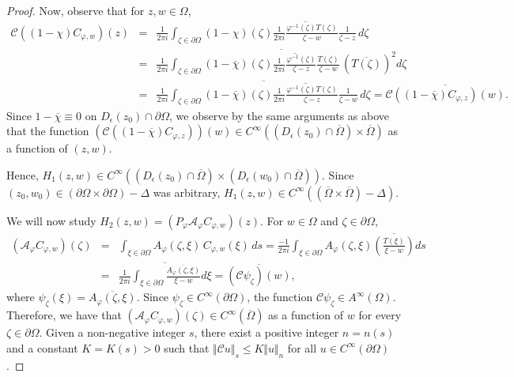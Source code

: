 \documentclass[11pt, reqno]{amsart}
\numberwithin{equation}{section}
\begin{document}
\begin{proof}
Now, observe that for $z,w\in\Omega$, 
\begin{eqnarray*}
\mathcal{C}((1-\chi)C_{\varphi,w})(z)
&=&
\frac{1}{2\pi i}\int_{\zeta\in\partial\Omega}(1-\chi)(\zeta) \overline{\frac{1}{2\pi i}\frac{\varphi^{-1}(\zeta)T(\zeta)}{\zeta-w}}\frac{1}{\zeta-z}\,d\zeta
\\
&=&
\overline{\frac{1}{2\pi i}\int_{\zeta\in\partial\Omega}(1-\overline{\chi})(\zeta) \overline{\frac{1}{2\pi i}\frac{\varphi^{-1}(\zeta)}{\zeta-z}}\frac{T(\zeta)}{\zeta-w}\,(\overline{T(\zeta)})^2 d\zeta}\\
&=&
\overline{\frac{1}{2\pi i}\int_{\zeta\in\partial\Omega}(1-\overline{\chi})(\zeta) \overline{\frac{1}{2\pi i}\frac{\varphi^{-1}(\zeta)T(\zeta)}{\zeta-z}}\frac{1}{\zeta-w}\,d\zeta}
=
\overline{\mathcal{C}((1-\overline{\chi})C_{\varphi,z})(w)}.
\end{eqnarray*}
Since $1-\overline{\chi}\equiv 0$ on $D_{\epsilon}(z_0)\cap\partial\Omega$, we observe by the same arguments as above that the function $(\mathcal{C}((1-\overline{\chi})C_{\varphi,z}))(w)\in C^{\infty}((D_{\epsilon}(z_0)\cap\overline{\Omega})\times \overline{\Omega})$ as a function of $(z,w)$. 

\medskip

Hence, $H_1(z,w)\in C^{\infty}((D_{\epsilon}(z_0)\cap\overline{\Omega})\times (D_{\epsilon}(w_0)\cap\overline{\Omega}))$. Since $(z_0,w_0)\in (\partial\Omega\times\partial\Omega)-\Delta$ was arbitrary, $H_1(z,w)\in C^{\infty}((\overline{\Omega}\times\overline{\Omega})-\Delta)$.

\medskip

We will now study $H_2(z,w)=(P_{\varphi} \mathcal{A}_{\varphi} C_{\varphi,w})(z)$. For $w\in\Omega$ and $\zeta\in\partial\Omega$,
\begin{eqnarray*}
(\mathcal{A}_{\varphi}C_{\varphi,w})(\zeta)&=&\int_{\xi\in\partial\Omega} A_{\varphi}(\zeta,\xi) \, C_{\varphi,w}(\xi) \,ds
=
\frac{-1}{2\pi i}\int_{\xi\in\partial\Omega} A_{\varphi}(\zeta,\xi) \overline{\left(\frac{T(\xi)}{\xi-w}\right)} ds\\
&=&
\overline{\frac{1}{2\pi i}\int_{\xi\in\partial\Omega} \frac{\overline{A_{\varphi}(\zeta,\xi)}}{\xi-w} d\xi}
=
\overline{(\mathcal{C} \psi_{\zeta})(w)},
\end{eqnarray*}
where $\psi_{\zeta}(\xi)=\overline{A_{\varphi}(\zeta,\xi)}$. Since $\psi_{\zeta}\in C^{\infty}(\partial\Omega)$, the function $\mathcal{C}\psi_{\zeta}\in A^{\infty}(\Omega)$. Therefore, we have that $(\mathcal{A}_{\varphi}C_{\varphi,w})(\zeta)\in C^{\infty}(\overline{\Omega})$ as a function of $w$ for every $\zeta\in\partial\Omega$. Given a non-negative integer $s$, there exist a positive integer $n=n(s)$ and a constant $K=K(s)>0$ such that $\Vert \mathcal{C}u\Vert_{s}\leq K\Vert u\Vert_n$ for all $u\in C^{\infty}(\partial\Omega)$. 


\end{proof}
\end{document}
